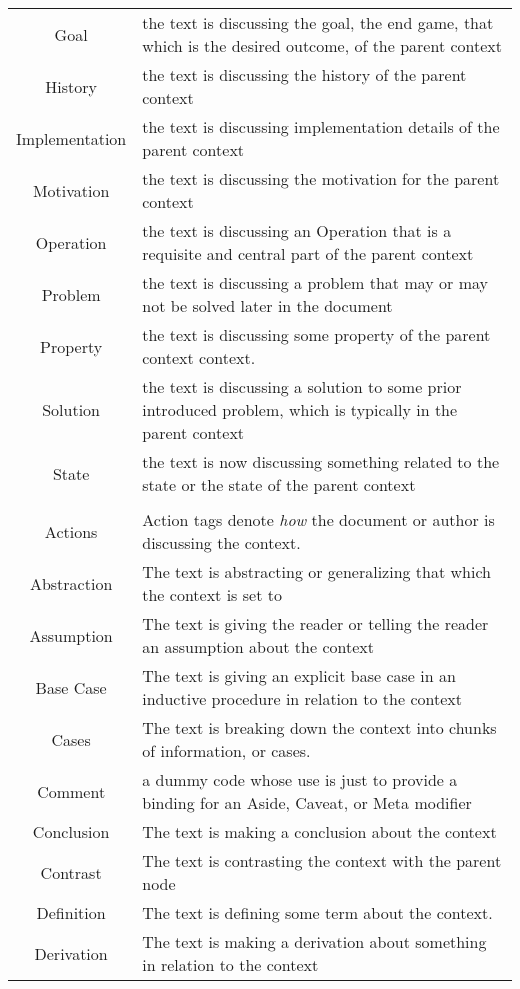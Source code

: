 \begin{table}[h!]
\begin{tabular}{c p{1.8\linewidth}}
    Goal & the text is discussing the goal, the end game, that which is the desired outcome, of the parent context\\
    History & the text is discussing the history of the parent context\\
    Implementation & the text is discussing implementation details of the parent context\\
    Motivation & the text is discussing the motivation for the parent context\\
    Operation & the text is discussing an Operation that is a requisite and central part of the parent context\\
    Problem & the text is discussing a problem that may or may not be solved later in the document\\
    Property & the text is discussing some property of the parent context context.\\
    Solution & the text is discussing a solution to some prior introduced problem, which is typically in the parent context\\
    State & the text is now discussing something related to the state or the state of the parent context\\
\\
    Actions & Action tags denote \emph{how} the document or author is discussing the context.\\
    \hline
    Abstraction & The text is abstracting or generalizing that which the context is set to\\
    Assumption & The text is giving the reader or telling the reader an assumption about the context \\
    Base Case & The text is giving an explicit base case in an inductive procedure in relation to the context\\
    Cases & The text is breaking down the context into chunks of information, or cases.\\
    Comment & a dummy code whose use is just to provide a binding for an Aside, Caveat, or Meta modifier\\
    Conclusion & The text is making a conclusion about the context\\
    Contrast &  The text is contrasting the context with the parent node \\
    Definition & The text is defining some term about the context.\\
    Derivation & The text is making a derivation about something in relation to the context\\

\end{tabular}
\end{table}
